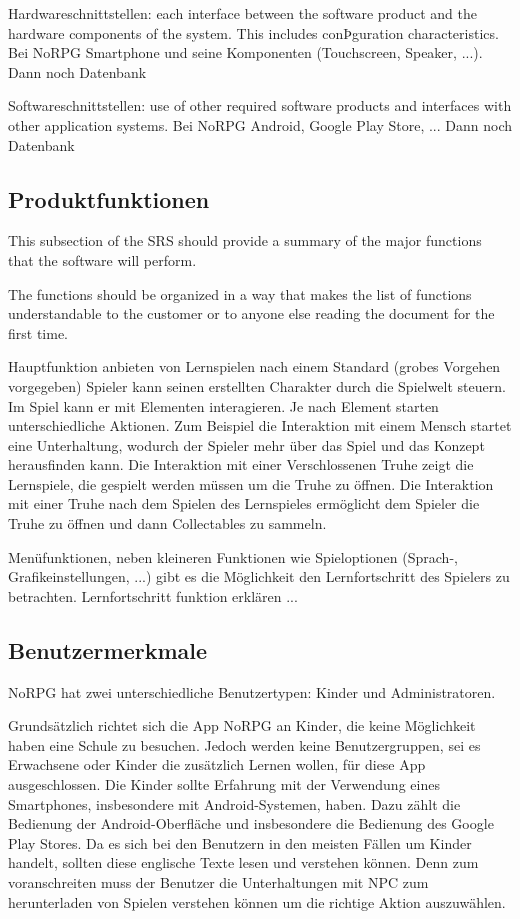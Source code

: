 		Hardwareschnittstellen: each interface between the software product and the hardware components of the system. This includes conÞguration characteristics. Bei NoRPG Smartphone und seine Komponenten (Touchscreen, Speaker, ...). Dann noch Datenbank
		
		Softwareschnittstellen: use of other required software products and interfaces with other application systems. Bei NoRPG Android, Google Play Store, ... Dann noch Datenbank

	\subsection{Produktfunktionen}
		This subsection of the SRS should provide a summary of the major functions that the software will perform. 
		
		The functions should be organized in a way that makes the list of functions understandable to the customer or to anyone else reading the document for the first time.
		
		Hauptfunktion anbieten von Lernspielen nach einem Standard (grobes Vorgehen vorgegeben)
		Spieler kann seinen erstellten Charakter durch die Spielwelt steuern. Im Spiel kann er mit Elementen interagieren. Je nach Element starten unterschiedliche Aktionen. Zum Beispiel die Interaktion mit einem Mensch startet eine Unterhaltung, wodurch der Spieler mehr über das Spiel und das Konzept herausfinden kann. Die Interaktion mit einer Verschlossenen Truhe zeigt die Lernspiele, die gespielt werden müssen um die Truhe zu öffnen. Die Interaktion mit einer Truhe nach dem Spielen des Lernspieles ermöglicht dem Spieler die Truhe zu öffnen und dann Collectables zu sammeln.
		
		Menüfunktionen, neben kleineren Funktionen wie Spieloptionen (Sprach-, Grafikeinstellungen, ...) gibt es die Möglichkeit den Lernfortschritt des Spielers zu betrachten. Lernfortschritt funktion erklären ...
		
	
	\subsection{Benutzermerkmale}
		NoRPG hat zwei unterschiedliche Benutzertypen: Kinder und Administratoren.
	
		Grundsätzlich richtet sich die App NoRPG an Kinder, die keine Möglichkeit haben eine Schule zu besuchen. Jedoch werden keine Benutzergruppen, sei es Erwachsene oder Kinder die zusätzlich Lernen wollen, für diese App ausgeschlossen. Die Kinder sollte Erfahrung mit der Verwendung eines Smartphones, insbesondere mit Android-Systemen, haben. Dazu zählt die Bedienung der Android-Oberfläche und insbesondere die Bedienung des Google Play Stores. Da es sich bei den Benutzern in den meisten Fällen um Kinder handelt, sollten diese englische Texte lesen und verstehen können. Denn zum voranschreiten muss der Benutzer die Unterhaltungen mit NPC zum herunterladen von Spielen verstehen können um die richtige Aktion auszuwählen.
		
